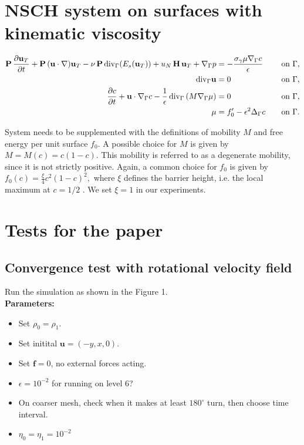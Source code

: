 \documentclass{article}
\newcommand{\vect}[1]{\boldsymbol{\mathbf{#1}}}
\newcommand{\bu}{\mathbf u}
\newcommand{\divG}{{\mathop{\,\rm div}}_{\Gamma}}
\newcommand{\gradG}{\nabla_{\Gamma}}
\newcommand{\nablaG}{\nabla_{\Gamma}}
\newcommand{\laplG}{\Delta_{\Gamma}}
\begin{document}
	\tableofcontents
\newpage	
\section{NSCH system on surfaces with kinematic viscosity}
\begin{align}
 \vect P\,\frac{\partial\vect u_T}{\partial t} + \vect P\,(\vect u\cdot\nabla)\vect u_T - \nu\,\vect P\divG(E_s(\vect u_T)) + u_N\,\vect H\,\vect u_T + \nabla_\Gamma p &=   - \frac{\sigma_\gamma \mu \nablaG c}{\epsilon} \quad &\text{on}~\Gamma,  \label{strongform-1} \\
\divG \bu & =0 \quad &\text{on}~\Gamma, \label{strongform-2}\\
 \frac{\partial c}{\partial t} +\bu\cdot\nablaG c-  \frac{1}{\epsilon}\divG \left(M \gradG \mu \right)  &= 0 \quad &\text{on}~\Gamma \label{eq:sys_CH1}, \\
\mu &= f_0' - \epsilon^2 \laplG c \quad &\text{on}~\Gamma. \label{eq:sys_CH2}
\end{align}


System needs to be supplemented with the
definitions of mobility $M$ and free energy per unit surface $f_0$. A possible choice for $M$
is given by $M = M(c) = c(1 - c).$
This mobility is referred to as a degenerate mobility, since it is not strictly positive.
Again, a common choice for $f_0$ is given by $f_0(c) = \frac{\xi}{4} c^2(1 - c)^2,$
where $\xi$ defines the barrier height, i.e. the local maximum at $c = 1/2$ . We set  $\xi = 1$ in our experiments.


\section{Tests for the paper}
\subsection{Convergence test with rotational velocity field}
Run the simulation as shown in the Figure 1.\\

{\color{red}\textbf{Parameters:}}\\
\begin{itemize}
	\item Set $\rho_0=\rho_1.$
	\item Set initital $\bu = (-y,x,0).$
	\item Set $\textbf{f} = 0$, no external forces acting.
	\item $\epsilon=10^{-2}$ for running on level 6?
	\item On coarser mesh, check when it makes at least $180^\circ$ turn, then choose time interval. 
	\item $\eta_0=\eta_1 = 10^{-2}$
\end{itemize}
\end{document}
